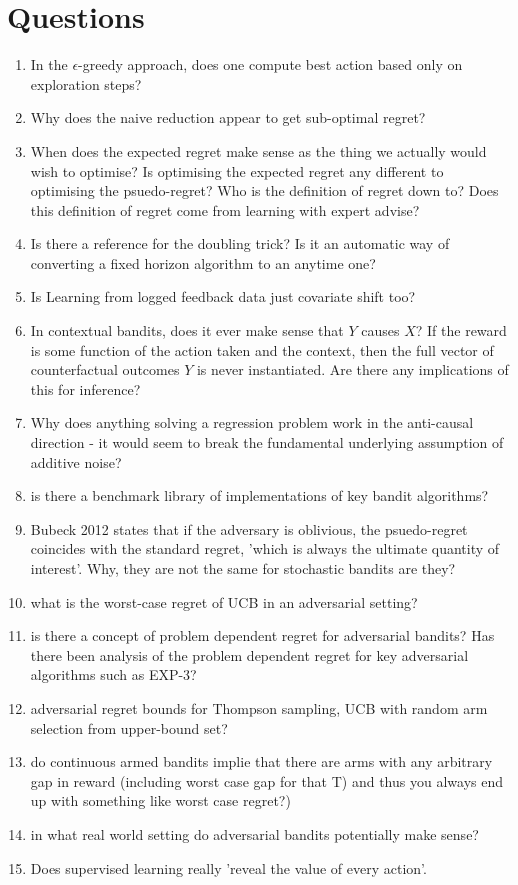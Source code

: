 \section{Questions}
\begin{enumerate}
\item In the $\epsilon$-greedy approach, does one compute best action based only on exploration steps?
\item Why does the naive reduction appear to get sub-optimal regret?
\item When does the expected regret make sense as the thing we actually would wish to optimise? Is optimising the expected regret any different to optimising the psuedo-regret? Who is the definition of regret down to? Does this definition of regret come from learning with expert advise?
\item Is there a reference for the doubling trick? Is it an automatic way of converting a fixed horizon algorithm to an anytime one?
\item Is Learning from logged feedback data just covariate shift too?
\item In contextual bandits, does it ever make sense that $Y$ causes $X$? If the reward is some function of the action taken and the context, then the full vector of counterfactual outcomes $Y$ is never instantiated. Are there any implications of this for inference?
\item Why does anything solving a regression problem work in the anti-causal direction - it would seem to break the fundamental underlying assumption of additive noise?
\item is there a benchmark library of implementations of key bandit algorithms?
\item Bubeck 2012 states that if the adversary is oblivious, the psuedo-regret coincides with the standard regret, 'which is always the ultimate quantity of interest'. Why, they are not the same for stochastic bandits are they?
\item what is the worst-case regret of UCB in an adversarial setting?
\item is there a concept of problem dependent regret for adversarial bandits? Has there been analysis of the problem dependent regret for key adversarial algorithms such as EXP-3?
\item adversarial regret bounds for Thompson sampling, UCB with random arm selection from upper-bound set?
\item do continuous armed bandits implie that there are arms with any arbitrary gap in reward (including worst case gap for that T) and thus you always end up with something like worst case regret?)
\item in what real world setting do adversarial bandits potentially make sense?
\item Does supervised learning really 'reveal the value of every action'.
\end{enumerate}

